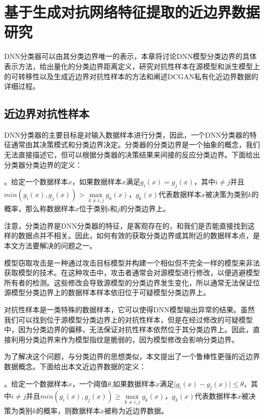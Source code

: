 
\chapter{基于生成对抗网络特征提取的近边界数据研究}\label{3}

DNN分类器可以由其分类边界唯一的表示，本章将讨论DNN模型分类边界的具体表示方法，给出量化的分类边界距离定义，研究对抗性样本在源模型和派生模型上的可转移性以及生成近边界对抗性样本的方法和阐述DCGAN私有化近边界数据的详细过程。

\section{近边界对抗性样本}

DNN分类器的主要目标是对输入数据样本进行分类，因此，一个DNN分类器的特征通常由其决策模式和分类边界决定。分类器的分类边界是一个抽象的概念，我们无法直接描述它，但可以根据分类器的决策结果来间接的反应分类边界。下面给出分类器分类边界的定义：

\begin{myDef}
	\label{def:1}
	。给定一个数据样本$x$，如果数据样本$x$满足$g_i(x) = g_j(x)$，其中$i \neq j $并且$min(g_i(x), g_j(x)) > \mathop{max} \limits_{k \neq i, j}g_k(x)$，$g_k(x)$代表数据样本$x$被决策为类别$k$的概率，那么称数据样本$x$位于类别$i$和$j$的分类边界上。
\end{myDef}

注意，分类边界是DNN分类器的特征，是客观存在的，和我们是否能直接找到这样的数据点并不相关。因此，如何有效的获取分类边界或其附近的数据样本点，是本文方法要解决的问题之一。

模型窃取攻击是一种通过攻击目标模型并构建一个相似但不完全一样的模型来非法获取模型的技术。在这种攻击中，攻击者通常会对源模型进行修改，以便逃避模型所有者的检测。这些修改会导致源模型的分类边界发生变化，所以通常无法保证位源模型分类边界上的数据样本样本依旧位于可疑模型分类边界上。

对抗性样本是一类特殊的数据样本，它可以使得DNN模型输出异常的结果。虽然我们可以找到位于源模型分类边界上的对抗性样本，但是在经过修改的可疑模型中，因为分类边界的偏移，无法保证对抗性样本依然位于其分类边界上。因此，直接利用分类边界来作为模型指纹是脆弱的，因为模型修改会影响分类边界。

为了解决这个问题，与分类边界的思想类似，本文提出了一个鲁棒性更强的近边界数据概念。下面给出本文近边界数据的定义：

\begin{myDef}
	\label{def:2}
	。给定一个数据样本$x$，一个阈值$\theta$,如果数据样本$x$满足$\vert g_i(x) - g_j(x) \vert \leq \theta$，其中$i \neq j $并且$min(g_i(x), g_j(x)) \geq \mathop{max} \limits_{k \neq i, j}g_k(x)$，$g_k(x)$代表数据样本$x$被决策为类别$k$的概率，则数据样本$x$被称为近边界数据。
\end{myDef}

